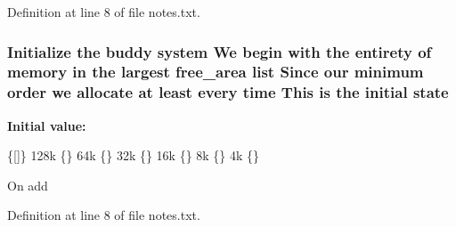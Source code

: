 Definition at line 8 of file notes.\+txt.

\subsubsection[{\texorpdfstring{state}{state}}]{\setlength{\rightskip}{0pt plus 5cm}Initialize the buddy system We begin with the entirety of memory {\bf in} the largest {\bf free\+\_\+area} {\bf list} Since our minimum {\bf order} we allocate at least every time This {\bf is} the initial state}\hypertarget{notes_8txt_abd9a65452f6ea6a1b99ec30c8a0ef8e4}{}\label{notes_8txt_abd9a65452f6ea6a1b99ec30c8a0ef8e4}
{\bfseries Initial value\+:}
\begin{DoxyCode}
\{[]\}
128k    \{\}
64k     \{\}
32k  \{\}
16k  \{\}
8k      \{\}
4k      \{\}

On add
\end{DoxyCode}


Definition at line 8 of file notes.\+txt.

